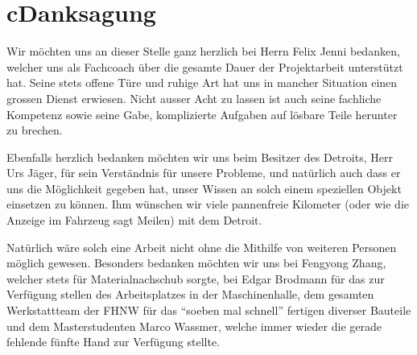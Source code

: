 \chapter*{c\quad Danksagung}
Wir möchten uns an dieser Stelle ganz herzlich bei Herrn Felix Jenni bedanken, welcher uns als Fachcoach über die gesamte Dauer der Projektarbeit unterstützt hat. Seine stets offene Türe und ruhige Art hat uns in mancher Situation einen grossen Dienst erwiesen. Nicht ausser Acht zu lassen ist auch seine fachliche Kompetenz sowie seine Gabe, komplizierte Aufgaben auf lösbare Teile herunter zu brechen.

Ebenfalls herzlich bedanken möchten wir uns beim Besitzer des Detroits, Herr Urs Jäger, für sein Verständnis für unsere Probleme, und natürlich auch dass er uns die Möglichkeit gegeben hat, unser Wissen an solch einem speziellen Objekt einsetzen zu können. Ihm wünschen wir viele pannenfreie Kilometer (oder wie die Anzeige im Fahrzeug sagt Meilen) mit dem Detroit.

Natürlich wäre solch eine Arbeit nicht ohne die Mithilfe von weiteren Personen möglich gewesen. Besonders bedanken möchten wir uns bei Fengyong Zhang, welcher stets für Materialnachschub sorgte, bei Edgar Brodmann für das zur Verfügung stellen des Arbeitsplatzes in der Maschinenhalle, dem gesamten Werkstattteam der FHNW für das "`soeben mal schnell"' fertigen diverser Bauteile und dem Masterstudenten Marco Wassmer, welche immer wieder die gerade fehlende fünfte Hand zur Verfügung stellte.

\color{black}